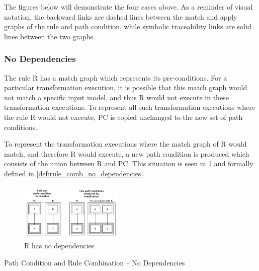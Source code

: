 The figures below will demonstrate the four cases above. As a reminder of visual notation, the backward links are dashed lines between the match and apply graphs of the rule and path condition, while symbolic traceability links are solid lines between the two graphs.

\subsubsection{No Dependencies}
\label{enum:no_back}

The rule R has a match graph which represents its pre-conditions. For a particular transformation execution, it is possible that this match graph would not match a specific input model, and thus R would not execute in these transformation executions. To represent all such transformation executions where the rule R would not execute, PC is copied unchanged to the new set of path conditions.

To represent the transformation executions where the match graph of R would match, and therefore R would execute, a new path condition is produced which consists of the union between R and PC. This situation is
seen in \cref{fig:no_dependencies} and formally defined in \cref{def:rule_comb_no_dependencies}.

\begin{figure}[bt] \centering \includegraphics[width=0.44\textwidth]{./figures/building_path_conditions/no_dependencies.pdf}
	\caption{R has no dependencies}
	\label{fig:no_dependencies}
\end{figure}

% 

\begin{definition}{Path Condition and Rule Combination -- No Dependencies\\}
\label{def:rule_comb_no_dependencies}

\end{definition}

